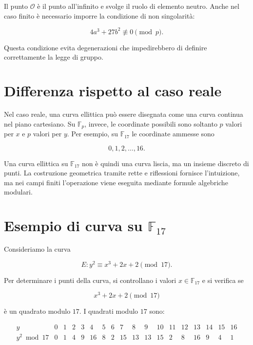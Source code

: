 \documentclass[12pt,a4paper,oneside]{report}
\begin{document}
Il punto \(\mathcal{O}\) è il punto all'infinito e svolge il ruolo di elemento neutro. Anche nel caso finito è necessario imporre la condizione di non singolarità:

\begin{equation}
    4a^3+27b^2\not\equiv 0 \pmod p.
    \label{eq:nonsingular-fp}
\end{equation}

Questa condizione evita degenerazioni che impedirebbero di definire correttamente la legge di gruppo.

\section{Differenza rispetto al caso reale}

Nel caso reale, una curva ellittica può essere disegnata come una curva continua nel piano cartesiano. Su \(\mathbb{F}_p\), invece, le coordinate possibili sono soltanto \(p\) valori per \(x\) e \(p\) valori per \(y\). Per esempio, su \(\mathbb{F}_{17}\) le coordinate ammesse sono

\[
0,1,2,\ldots,16.
\]

Una curva ellittica su \(\mathbb{F}_{17}\) non è quindi una curva liscia, ma un insieme discreto di punti. La costruzione geometrica tramite rette e riflessioni fornisce l'intuizione, ma nei campi finiti l'operazione viene eseguita mediante formule algebriche modulari.

\section{Esempio di curva su \texorpdfstring{\(\mathbb{F}_{17}\)}{F17}}

Consideriamo la curva

\begin{equation}
    E: y^2 \equiv x^3+2x+2 \pmod{17}.
    \label{eq:example-curve-f17}
\end{equation}

Per determinare i punti della curva, si controllano i valori \(x\in\mathbb{F}_{17}\) e si verifica se

\[
x^3+2x+2 \pmod{17}
\]

è un quadrato modulo \(17\). I quadrati modulo \(17\) sono:

\[
\begin{array}{c|ccccccccccccccccc}
y & 0&1&2&3&4&5&6&7&8&9&10&11&12&13&14&15&16\\
\hline
y^2 \bmod 17 & 0&1&4&9&16&8&2&15&13&13&15&2&8&16&9&4&1
\end{array}
\]
\end{document}
